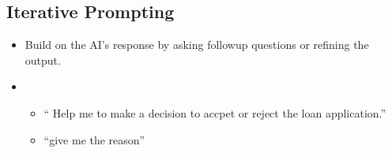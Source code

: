\documentclass[letterpaper,11pt,english]{sphinxmanual}
\begin{document}
\subsection{Iterative Prompting}
\label{\detokenize{prompt:iterative-prompting}}\begin{itemize}
\item {} 
\sphinxAtStartPar
Build on the AI’s response by asking follow\sphinxhyphen{}up questions or refining the output.

\item {} 
\sphinxAtStartPar
{}
\begin{itemize}
\item {} 
\sphinxAtStartPar
{} “ Help me to make a decision to accpet or reject the loan application.”

\item {} 
\sphinxAtStartPar
{} “give me the reason”

\end{itemize}

\end{itemize}
\end{document}
